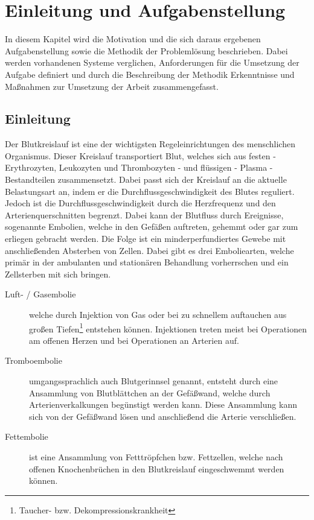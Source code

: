 \chapter{Einleitung und Aufgabenstellung}
In diesem Kapitel wird die Motivation und die sich daraus ergebenen Aufgabenstellung sowie die Methodik der Problemlösung beschrieben. Dabei werden vorhandenen Systeme verglichen, Anforderungen für die Umsetzung der Aufgabe definiert und durch die Beschreibung der Methodik Erkenntnisse und Maßnahmen zur Umsetzung der Arbeit zusammengefasst.
\section{Einleitung}
Der Blutkreislauf ist eine der wichtigsten Regeleinrichtungen des menschlichen Organismus. Dieser Kreislauf transportiert Blut, welches sich aus festen - Erythrozyten, Leukozyten und Thrombozyten - und flüssigen - Plasma - Bestandteilen zusammensetzt. Dabei passt sich der Kreislauf an die aktuelle Belastungsart an, indem er die Durchflussgeschwindigkeit des Blutes reguliert. Jedoch ist die Durchflussgeschwindigkeit durch die Herzfrequenz und den Arterienquerschnitten begrenzt.
Dabei kann der Blutfluss durch Ereignisse, sogenannte Embolien, welche in den Gefäßen auftreten, gehemmt oder gar zum erliegen gebracht werden. Die Folge ist ein minderperfundiertes Gewebe mit anschließenden Absterben von Zellen. Dabei gibt es drei Emboliearten, welche primär in der ambulanten und stationären Behandlung vorherrschen und ein Zellsterben mit sich bringen.
\begin{description}
\item[Luft- / Gasembolie] welche durch Injektion von Gas oder bei zu schnellem auftauchen aus großen Tiefen\footnote{Taucher- bzw. Dekompressionskrankheit} entstehen können. Injektionen treten meist bei Operationen am offenen Herzen und bei Operationen an Arterien auf.
\item[Tromboembolie] umgangssprachlich auch \glqq Blutgerinnsel\grqq{} genannt, entsteht durch eine Ansammlung von Blutblättchen an der Gefäßwand, welche durch Arterienverkalkungen begünstigt werden kann. Diese Ansammlung kann sich von der Gefäßwand lösen und anschließend die Arterie verschließen.
\item[Fettembolie] ist eine Ansammlung von Fetttröpfchen bzw. Fettzellen, welche nach offenen Knochenbrüchen in den Blutkreislauf eingeschwemmt werden können.
\end{description}
